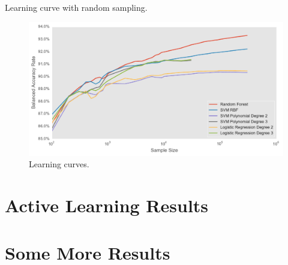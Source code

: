 Learning curve with random sampling.


\begin{figure}[h]
	\centering
	\includegraphics[width=\textwidth]{figures/learning_curves}
	\caption{Learning curves.}
	\label{fig:learning}
\end{figure}



\section{Active Learning Results}
\label{sec:results1}

\section{Some More Results}
\label{sec:results2}

